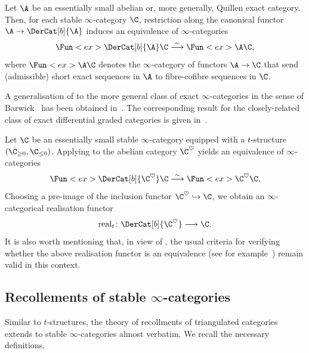 \documentclass[a4paper]{amsart}
\begin{document}
\begin{theorem}
  \label{thm:uniprop-Db}
  Let $\A$ be an essentially small abelian or, more generally, Quillen exact
  category. Then, for each stable $\infty$-category $\C$, restriction along the
  canonical functor $\A\to\DerCat[b]{\A}$ induces an equivalence of
  $\infty$-categories
  \[
    \Fun<ex>{\DerCat[b]{\A}}{\C}\stackrel{\sim}{\longrightarrow}\Fun<ex>{\A}{\C},
  \]
  where $\Fun<ex>{\A}{\C}$ denotes the $\infty$-category of functors $\A\to\C$
  that send (admissible) short exact sequences in $\A$ to fibre-cofibre
  sequences in $\C$.
\end{theorem}

\begin{remark}
  A generalisation of  to the more general class of exact
  $\infty$-categories in the sense of Barwick~\cite{Bar15a} has been obtained
  in~\cite[Theorem~1.2]{Kle22}. The corresponding result for the closely-related
  class of exact differential graded categories is given
  in~\cite[Theorem~3.1]{Che24}.
\end{remark}

\begin{example}
  Let $\C$ be an essentially small stable $\infty$-category equipped with a
  $t$-structure $(\C_{\geq0},\C_{\leq0})$. Applying  to the
  abelian category $\C^\heartsuit$ yields an equivalence of $\infty$-categories
  \[
    \Fun<ex>{\DerCat[b]{\C^\heartsuit}}{\C}\stackrel{\sim}{\longrightarrow}\Fun<ex>{\C^\heartsuit}{\C}.
  \]
  Choosing a pre-image of the inclusion functor $\C^\heartsuit\hookrightarrow\C$, we obtain an
  $\infty$-categorical realisation functor
  \[
    \operatorname{real}_t\colon\DerCat[b]{\C^\heartsuit}\longrightarrow\C.
  \]
  It is also worth mentioning that, in view of
  , the usual criteria for
  verifying whether the above realisation functor is an equivalence (see for
  example~\cite[Theorem~3.11]{PV18}) remain valid in this context.
\end{example}

\subsection{Recollements of stable $\infty$-categories}

Similar to $t$-structures, the theory of recollments of triangulated
categories~\cite{CPS88} extends to stable $\infty$-categories almost verbatim.
We recall the necessary definitions.
\end{document}
